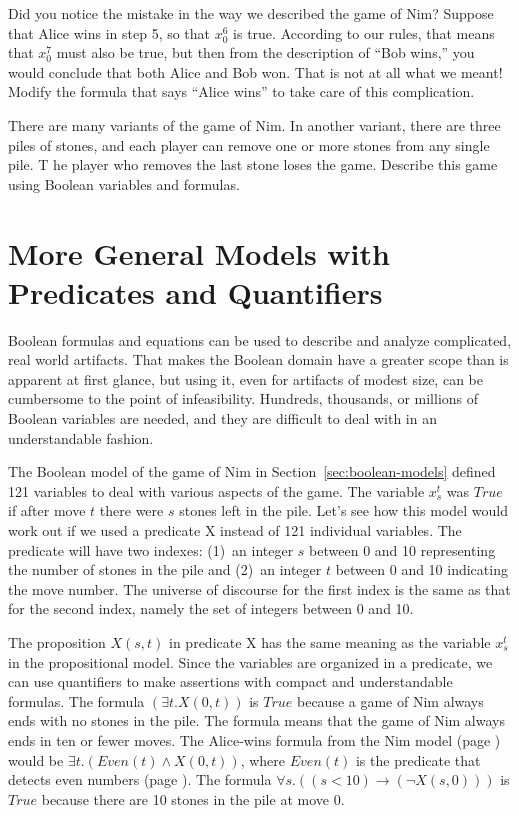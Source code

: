 {{\begin{ExerciseList}
\Exercise
Did you notice the mistake in the way we described the game of Nim?
Suppose that Alice wins in step 5, so that $x_{0}^{6}$ is true.
According to our rules, that means that $x_{0}^{7}$ must also be true,
but then from the description of ``Bob wins,''
you would conclude that both Alice and Bob won.
That is not at all what we meant! Modify the formula that says ``Alice wins''
to take care of this complication.

\Exercise
There are many variants of the game of Nim.
In another variant, there are three piles of stones, and each player can remove
one or more stones from any single pile. T
he player who removes the last stone loses the game.
Describe this game using Boolean variables and formulas.

\end{ExerciseList}

\section{More General Models with Predicates and Quantifiers}
\label{sec:predicates}

Boolean formulas and equations can be used
to describe and analyze complicated, real world artifacts.
That makes the Boolean domain have a greater scope than is apparent at first glance,
but using it, even for artifacts of modest size,
can be cumbersome to the point of infeasibility.
Hundreds, thousands, or millions of Boolean variables are needed,
and they are difficult to deal with in an understandable fashion.

The Boolean model of the game of Nim in Section~\ref{sec:boolean-models}
defined 121 variables to deal with various aspects of the game.
The variable $x_s^t$
was $True$ if after move $t$ there were $s$ stones left in the pile.
Let's see how this model would work out if we used a predicate X
instead of 121 individual variables.
The predicate will have two indexes: (1)~an integer $s$ between 0 and 10
representing the number of stones in the pile
and (2)~an integer $t$ between 0 and 10 indicating the move number.
The universe of discourse for the first index is the same as that
for the second index, namely the set of integers between 0 and 10.

The proposition $X(s,t)$ in predicate X has the same meaning as the variable
$x_s^t$ in the propositional model.
Since the variables are organized in a predicate,
we can use quantifiers to make assertions with compact and understandable formulas.
The formula  $(\exists t.X(0,t))$
is $True$ because a game of Nim always ends with no
stones in the pile.
The formula means that the game of Nim always ends in ten or fewer moves.
The Alice-wins formula
from the Nim model (page \pageref{alice-wins-formula})
would be $\exists t.(Even(t) \wedge X(0,t))$,
where
$Even(t)$ is the predicate that detects even numbers
(page \pageref{even-number-predicate-Even}).
The formula $\forall s.((s < 10) \rightarrow (\neg X(s,0)))$
is $True$ because there are 10 stones in the pile at move 0.

}}
